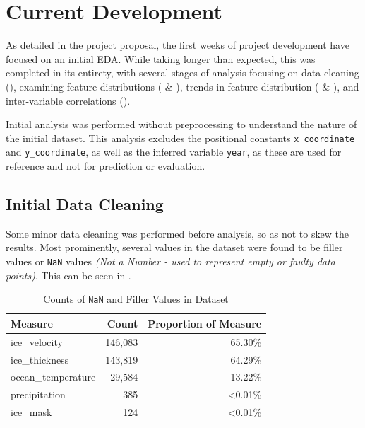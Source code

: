 \chapter{Current Development}\label{C:eda}
As detailed in the project proposal, the first weeks of project development have focused on an initial EDA. While taking longer than expected, this was completed in its entirety, with several stages of analysis focusing on data cleaning (), examining feature distributions ( \& ),  trends in feature distribution ( \& ), and inter-variable correlations (). 

Initial analysis was performed without preprocessing to understand the nature of the initial dataset. This analysis excludes the positional constants \texttt{x\_coordinate} and \texttt{y\_coordinate}, as well as the inferred variable \texttt{year}, as these are used for reference and not for prediction or evaluation. 

\section{Initial Data Cleaning}\label{S:IDC}

Some minor data cleaning was performed before analysis, so as not to skew the results. Most prominently, several values in the dataset were found to be filler values or \texttt{NaN} values \textit{(Not a Number - used to represent empty or faulty data points)}. This can be seen in .

\begin{table}[H]
  \centering
  \begin{tabular}{|l|r|r|}
  \hline
  Measure & Count & Proportion of Measure \\ \hline
  ice\_velocity & 146,083 & 65.30\% \\ \hline
  ice\_thickness & 143,819 & 64.29\% \\ \hline
  ocean\_temperature & 29,584 & 13.22\% \\ \hline
  precipitation & 385 & \textless{0.01}\% \\ \hline
  ice\_mask & 124 & \textless{0.01}\% \\ \hline
  \end{tabular}
  \caption{Counts of \texttt{NaN} and Filler Values in Dataset}
  \label{table:nan_counts}
\end{table}
  
